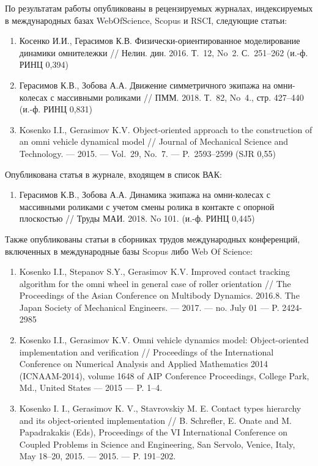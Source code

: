 По результатам работы опубликованы в рецензируемых журналах, индексируемых в международных базах WebOfScience, Scopus и RSCI, следующие статьи:

\begin{enumerate}
    \item Косенко И.И., Герасимов К.В. Физически-ориентированное моделирование динамики омнитележки // Нелин. дин. 2016. Т.~12, No~2. С.~251--262 (и.-ф. РИНЦ 0,394)
    \item Герасимов К.В., Зобова А.А. Движение симметричного экипажа на омни-колесах с массивными роликами // ПММ. 2018. Т.~82, No~4., стр. 427--440 (и.-ф. РИНЦ 0,831)
    \item Kosenko I.I., Gerasimov K.V. Object-oriented approach to the cons\-truc\-tion of an omni vehicle dynamical model // Journal of Mechanical Science and Technology. — 2015. — Vol.~29, No.~7. — P.~2593--2599 (SJR 0,55)
\end{enumerate}
Опубликована статья в журнале, входящем в список ВАК:
\begin{enumerate}
    \addtocounter{enumi}{3}
    \item Герасимов К.В., Зобова А.А. Динамика экипажа на омни-ко\-ле\-сах с массивными роликами с учетом смены ролика в контакте с опорной плоскостью // Труды МАИ. 2018. No 101. (и.-ф. РИНЦ 0,445)
\end{enumerate}
Также опубликованы статьи в сборниках трудов международных конференций, включенных в международные базы Scopus либо Web Of Science:
\begin{enumerate}
    \addtocounter{enumi}{4}
    \item Kosenko I.I., Stepanov S.Y., Gerasimov K.V. Improved contact tracking algorithm for the omni wheel in general case of roller orientation // The Proceedings of the Asian Conference on Multi\-bo\-dy Dynamics. 2016.8. The Japan Society of Mechanical Engineers. — 2017. — no. July 01 — P. 2424-2985
    \item Kosenko I.I., Gerasimov K.V. Omni vehicle dynamics model: Object-oriented implementation and verification // Proceedings of the International Conference on Numerical Analysis and Applied Mathe\-ma\-tics 2014 (ICNAAM-2014), volume 1648 of AIP Conference Pro\-cee\-dings, College Park, Md., United States — 2015 — P. 1–4.
    \item Kosenko I. I., Gerasimov K. V., Stavrovskiy M. E. Contact types hierarchy and its object-oriented implementation // B. Schrefler, E. Onate and M. Papadrakakis (Eds), Proceedings of the VI Inter\-na\-tional Conference on Coupled Problems in Science and Engineering, San Servolo, Venice, Italy, May 18–20, 2015. — 2015. — P. 191–202.
\end{enumerate}
